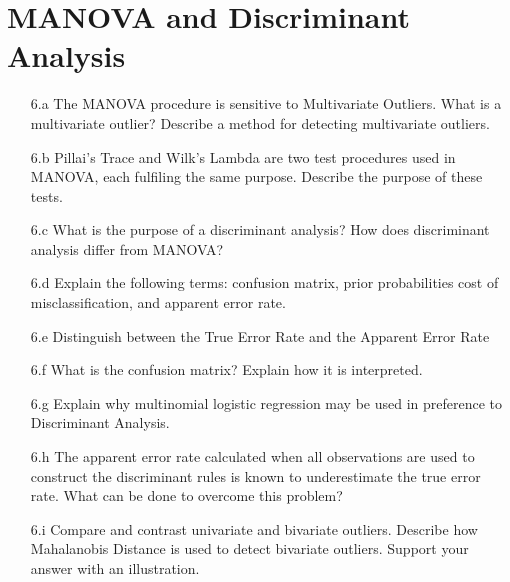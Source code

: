 \documentclass[a4paper,12pt]{article}
\begin{document}
\section*{MANOVA and Discriminant Analysis}
\begin{itemize}
\item[6.a] The MANOVA procedure is sensitive to Multivariate Outliers. What is a multivariate outlier? Describe a method for detecting multivariate outliers.

\item[6.b] Pillai's Trace and Wilk's Lambda are two test procedures used in MANOVA, each fulfiling the same purpose.
Describe the purpose of these tests.

\item[6.c] What is the purpose of a discriminant analysis? How does discriminant analysis differ from MANOVA?

\item[6.d] Explain the following terms: confusion matrix, prior probabilities cost of misclassification, and apparent error rate.

\item[6.e] Distinguish between the True Error Rate and the Apparent Error Rate

\item[6.f]  What is the confusion matrix? Explain how it is interpreted.

\item[6.g] Explain why multinomial logistic regression may be used in preference to Discriminant Analysis.

\item[6.h] The apparent error rate calculated when all observations are used to construct
the discriminant rules is known to underestimate the true error rate. What can be done
to overcome this problem?

\item[6.i] Compare and contrast univariate and bivariate outliers. Describe how Mahalanobis Distance is used to detect bivariate outliers. Support your answer with an illustration.

\end{itemize}
\end{document}

